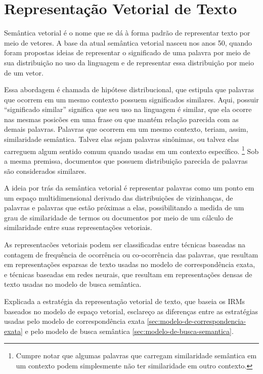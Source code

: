 \documentclass[
	12pt,				%
	openright,			%
	oneside,			%
	a4paper,			%
	english,			%
	french,				%
	spanish,			%
	brazil				%
	]{abntex2}
\begin{document}
\section{Representação Vetorial de Texto}\label{sec:representacao-vetorial-de-texto}

Semântica vetorial é o nome que se dá à forma padrão de representar texto por meio de vetores.
A base da atual semântica vetorial nasceu nos anos 50, quando foram propostas ideias de representar
o significado de uma palavra por meio de sua distribuição no uso da linguagem e de representar essa distribuição por meio de um vetor.
\cite{JurafskyMartin2023}

Essa abordagem é chamada de hipótese distribucional, que estipula que palavras que ocorrem em um mesmo contexto possuem significados similares. \cite{PilehvarCamacho-Collados2022}
Aqui, possuir ``significado similar'' significa que seu uso na linguagem é similar, que ela ocorre nas mesmas posicões em uma frase ou que mantém relação parecida com as demais palavras.
Palavras que ocorrem em um mesmo contexto, teriam, assim, similaridade semântica.
Talvez elas sejam palavras sinônimas, ou talvez elas carreguem algum sentido comum quando usadas em um contexto específico.
\footnote{Cumpre notar que algumas palavras que carregam similaridade semântica em um contexto podem simplesmente não ter similaridade em outro contexto.}
Sob a mesma premissa, documentos que possuem distribuição parecida de palavras são considerados similares.

A ideia por trás da semântica vetorial é representar palavras como um ponto em um espaço multidimensional derivado das distribuições de vizinhanças, de palavras e palavras que estão próximas a elas,
possibilitando a medida de um grau de similaridade de termos ou documentos por meio de um cálculo de similaridade entre suas representações vetoriais.\cite{JurafskyMartin2023}

As representacões vetoriais podem ser classificadas entre técnicas baseadas na contagem de frequência de ocorrência
ou co-ocorrência das palavras, que resultam em representações esparsas de texto usadas no modelo de correspondência exata, e técnicas baseadas em redes neurais, que resultam
em representações densas de texto usadas no modelo de busca semântica.

Explicada a estratégia da representação vetorial de texto, que baseia os IRMs baseados no modelo de espaço vetorial, esclareço as diferenças entre as estratégias usadas pelo modelo de correspondência exata \ref{sec:modelo-de-correspondencia-exata} e pelo modelo de busca semântica \ref{sec:modelo-de-busca-semantica}.
\end{document}
